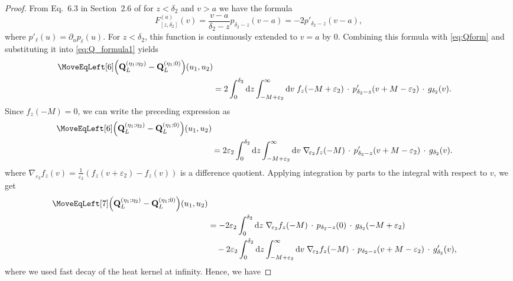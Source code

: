 \documentclass[oneside,final,11pt]{amsart}
\theoremstyle{definition}
\renewcommand{\d}{\mathrm{d}}
\newcommand{\1}[1]{\mathbf{1}_{#1}}
\newcommand{\eps}{\varepsilon}
\newcommand{\fQ}{\mathbf{Q}}
\numberwithin{equation}{section}
\begin{document}
\begin{proof}
From Eq.~6.3 in Section~2.6 of \cite{karatzas1998brownian} for $z < \delta_2$ and $v > a$ we have the formula
\begin{equation}\label{eq:density_stopping_time2}
	F^{(a)}_{[z, \delta_2]} (v) = \frac{v - a}{\delta_2 - z} p_{\delta_2 - z} (v - a) = - 2 p'_{\delta_2 - z} (v - a),
\end{equation}
where $p'_{\ell} (u) = \partial_u p_{\ell} (u)$. For $z < \delta_2$, this function is continuously extended to $v = a$ by $0$. Combining this formula with \eqref{eq:Qform} and substituting it into \eqref{eq:Q_formula1} yields
\begin{equation}
	\begin{split}
	\MoveEqLeft[6]
	\Bigl(\fQ_L^{(\eta_1; \eta_2)} - \fQ_L^{(\eta_1; 0)}\Bigr)(u_1, u_2)\\
	&= 2 \int_{0}^{\delta_2} \d z \int_{-M + \eps_2}^{\infty} \d v\; f_z(-M + \eps_2) \,\cdot\, p'_{\delta_2 - z}(v + M - \eps_2) \,\cdot\, g_{\delta_2}(v).
	\end{split}
\end{equation}
Since $f_z(-M) = 0$, we can write the preceding expression as
\begin{equation}
\begin{split}
\MoveEqLeft[6]
	\Bigl(\fQ_L^{(\eta_1; \eta_2)} - \fQ_L^{(\eta_1; 0)}\Bigr)(u_1, u_2)\\
	&= 	2 \eps_2 \int_{0}^{\delta_2} \d z \int_{-M + \eps_2}^{\infty} \d v\; \nabla_{\!\eps_2} f_z(-M) \,\cdot\, p'_{\delta_2 - z}(v + M - \eps_2) \,\cdot\, g_{\delta_2}(v).
\end{split}
\end{equation}
where $\nabla_{\!\eps_2} f_z(v) = \frac{1}{\eps_2} (f_z(v + \eps_2) - f_z(v))$ is a difference quotient. Applying integration by parts to the integral with respect to $v$, we get
\begin{equation*}
\begin{split}
\MoveEqLeft[7]
	\Bigl(\fQ_L^{(\eta_1; \eta_2)} - \fQ_L^{(\eta_1; 0)}\Bigr)(u_1, u_2)\\
	&= 	- 2 \eps_2 \int_{0}^{\delta_2} \d z\; \nabla_{\!\eps_2} f_z(-M) \,\cdot\, p_{\delta_2 - z}(0) \,\cdot\, g_{\delta_2}(-M + \eps_2)\\
	&\quad- 2 \eps_2 \int_{0}^{\delta_2} \d z \int_{-M + \eps_2}^{\infty} \d v\; \nabla_{\!\eps_2} f_z(-M) \,\cdot\, p_{\delta_2 - z}(v + M - \eps_2) \,\cdot\, g'_{\delta_2}(v),
\end{split}
\end{equation*}
where we used fast decay of the heat kernel at infinity. Hence, we have

\end{proof}
\end{document}
